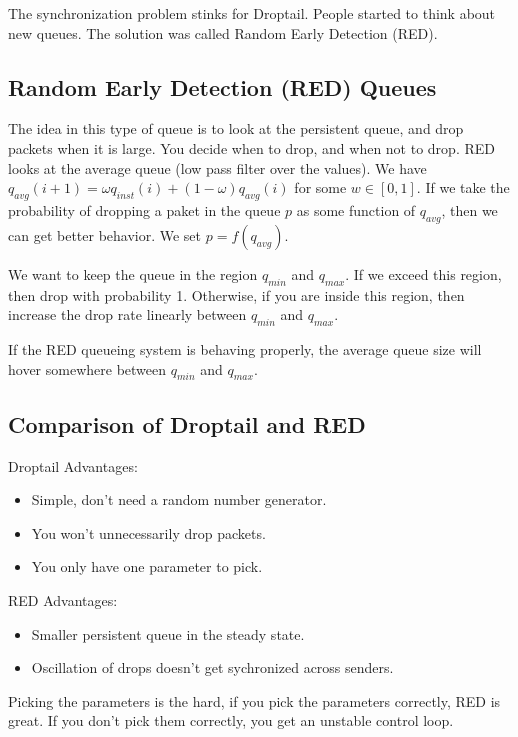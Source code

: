 \documentclass[psamsfonts]{amsart}
\begin{document}
The synchronization problem stinks for Droptail. People started to think about new queues. The solution was called Random Early Detection (RED). 

\subsection{Random Early Detection (RED) Queues}

The idea in this type of queue is to look at the persistent queue, and drop packets when it is large. You decide when to drop, and when not to drop. RED looks at the average queue (low pass filter over the values). We have $q_{avg}(i+1) = \omega q_{inst}(i) + (1 - \omega) q_{avg}(i)$ for some $w \in [0,1]$. If we take the probability of dropping a paket in the queue $p$ as some function of $q_{avg}$, then we can get better behavior. We set $p = f(q_{avg})$.

We want to keep the queue in the region $q_{min}$ and $q_{max}$. If we exceed this region, then drop with probability 1. Otherwise, if you are inside this region, then increase the drop rate linearly between $q_{min}$ and $q_{max}$.

If the RED queueing system is behaving properly, the average queue size will hover somewhere between $q_{min}$ and $q_{max}$.

\subsection{Comparison of Droptail and RED}

Droptail Advantages:
\begin{itemize}
  \item Simple, don't need a random number generator.
  \item You won't unnecessarily drop packets.
  \item You only have one parameter to pick.
\end{itemize}

RED Advantages:
\begin{itemize}
  \item Smaller persistent queue in the steady state.
  \item Oscillation of drops doesn't get sychronized across senders.
\end{itemize}

Picking the parameters is the hard, if you pick the parameters correctly, RED is great. If you don't pick them correctly, you get an unstable control loop.
\end{document}
